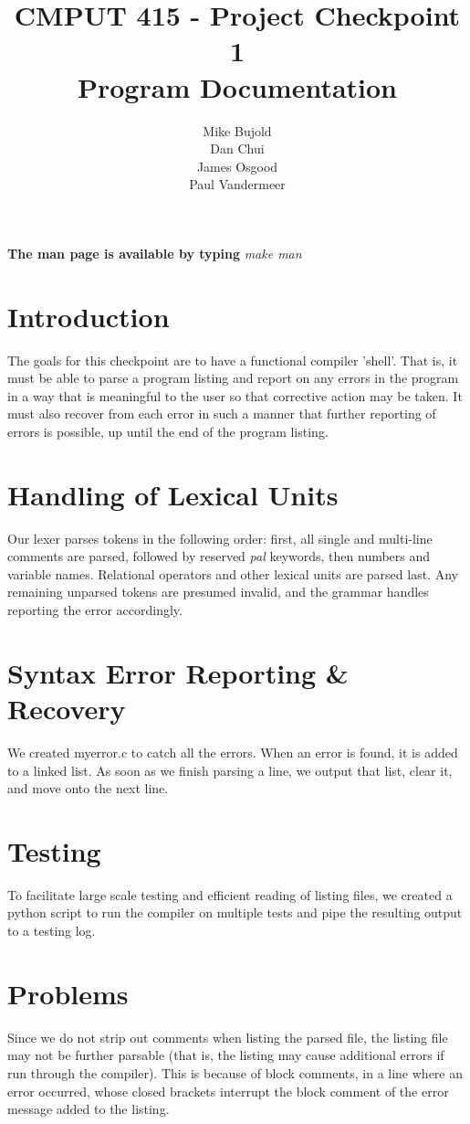 \documentclass{report}
\title{CMPUT 415 - Project Checkpoint 1\\Program Documentation}
\author{Mike Bujold \\
Dan Chui \\ 
James Osgood \\
Paul Vandermeer}
\begin{document}
\maketitle
\textbf{The man page is available by typing} \emph{make man}

\section*{Introduction}
The goals for this checkpoint are to have a functional compiler 'shell'. That is, it must be able to parse a program listing and report on any errors in the program in a way that is meaningful to the user so that corrective action may be taken. It must also recover from each error in such a manner that further reporting of errors is possible, up until the end of the program listing.


\section*{Handling of Lexical Units}
Our lexer parses tokens in the following order: first, all single and multi-line comments are parsed, followed by reserved \emph{pal} keywords, then numbers and variable names. Relational operators and other lexical units are parsed last. Any remaining unparsed tokens are presumed invalid, and the grammar handles reporting the error accordingly.

\section*{Syntax Error Reporting \& Recovery}
We created myerror.c to catch all the errors. When an error is found, it is added to a linked list. As soon as we finish parsing a line, we output that list, clear it, and move onto the next line. 

\section*{Testing}
To facilitate large scale testing and efficient reading of listing files, we created a python script to run the compiler on multiple tests and pipe the resulting output to a testing log.

\section*{Problems}
Since we do not strip out comments when listing the parsed file, the listing file may not be further parsable (that is, the listing may cause additional errors if run through the compiler). This is because of block comments, in a line where an error occurred, whose closed brackets interrupt the block comment of the error message added to the listing.
\end{document}
